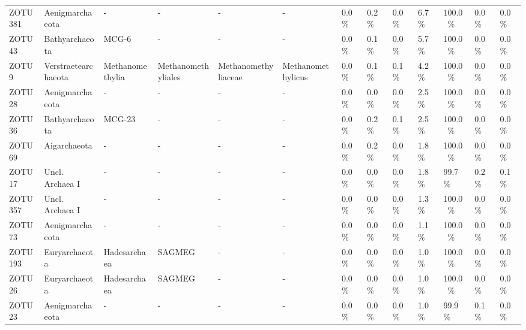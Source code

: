 \begin{table}
\begin{adjustbox}{max width=0.8\textwidth, max totalheight=0.85\textheight, keepaspectratio}
\begin{tabular}{llllllllll||lll}
ZOTU381 & Aenigmarchaeota & - & - & - & - & \SI{0.0}{\percent} & \SI{0.2}{\percent} & \SI{0.0}{\percent} & \SI{6.7}{\percent} & \SI{100.0}{\percent} & \SI{0.0}{\percent} & \SI{0.0}{\percent} \\
ZOTU43 & Bathyarchaeota & MCG-6 & - & - & - & \SI{0.0}{\percent} & \SI{0.1}{\percent} & \SI{0.0}{\percent} & \SI{5.7}{\percent} & \SI{100.0}{\percent} & \SI{0.0}{\percent} & \SI{0.0}{\percent} \\
ZOTU9 & Verstraetearchaeota & Methanomethylia & Methanomethyliales & Methanomethyliaceae & Methanomethylicus & \SI{0.0}{\percent} & \SI{0.1}{\percent} & \SI{0.1}{\percent} & \SI{4.2}{\percent} & \SI{100.0}{\percent} & \SI{0.0}{\percent} & \SI{0.0}{\percent} \\
ZOTU28 & Aenigmarchaeota & - & - & - & - & \SI{0.0}{\percent} & \SI{0.0}{\percent} & \SI{0.0}{\percent} & \SI{2.5}{\percent} & \SI{100.0}{\percent} & \SI{0.0}{\percent} & \SI{0.0}{\percent} \\
ZOTU36 & Bathyarchaeota & MCG-23 & - & - & - & \SI{0.0}{\percent} & \SI{0.2}{\percent} & \SI{0.1}{\percent} & \SI{2.5}{\percent} & \SI{100.0}{\percent} & \SI{0.0}{\percent} & \SI{0.0}{\percent} \\
ZOTU69 & Aigarchaeota & - & - & - & - & \SI{0.0}{\percent} & \SI{0.2}{\percent} & \SI{0.0}{\percent} & \SI{1.8}{\percent} & \SI{100.0}{\percent} & \SI{0.0}{\percent} & \SI{0.0}{\percent} \\
ZOTU17 & Uncl. Archaea I & - & - & - & - & \SI{0.0}{\percent} & \SI{0.0}{\percent} & \SI{0.0}{\percent} & \SI{1.8}{\percent} & \SI{99.7}{\percent} & \SI{0.2}{\percent} & \SI{0.1}{\percent} \\
ZOTU357 & Uncl. Archaea I & - & - & - & - & \SI{0.0}{\percent} & \SI{0.0}{\percent} & \SI{0.0}{\percent} & \SI{1.3}{\percent} & \SI{100.0}{\percent} & \SI{0.0}{\percent} & \SI{0.0}{\percent} \\
ZOTU73 & Aenigmarchaeota & - & - & - & - & \SI{0.0}{\percent} & \SI{0.0}{\percent} & \SI{0.0}{\percent} & \SI{1.1}{\percent} & \SI{100.0}{\percent} & \SI{0.0}{\percent} & \SI{0.0}{\percent} \\
ZOTU193 & Euryarchaeota & Hadesarchaea & SAGMEG & - & - & \SI{0.0}{\percent} & \SI{0.0}{\percent} & \SI{0.0}{\percent} & \SI{1.0}{\percent} & \SI{100.0}{\percent} & \SI{0.0}{\percent} & \SI{0.0}{\percent} \\
ZOTU26 & Euryarchaeota & Hadesarchaea & SAGMEG & - & - & \SI{0.0}{\percent} & \SI{0.0}{\percent} & \SI{0.0}{\percent} & \SI{1.0}{\percent} & \SI{100.0}{\percent} & \SI{0.0}{\percent} & \SI{0.0}{\percent} \\
ZOTU23 & Aenigmarchaeota & - & - & - & - & \SI{0.0}{\percent} & \SI{0.0}{\percent} & \SI{0.0}{\percent} & \SI{1.0}{\percent} & \SI{99.9}{\percent} & \SI{0.1}{\percent} & \SI{0.0}{\percent} \\
\bottomrule
\end{tabular}
\end{adjustbox}
\end{table}

